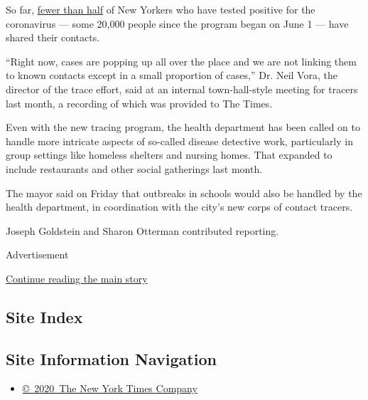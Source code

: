 So far,
\href{https://hhinternet.blob.core.windows.net/uploads/2020/07/test-and-trace-data-metrics-20200727.pdf}{fewer
than half} of New Yorkers who have tested positive for the coronavirus
--- some 20,000 people since the program began on June 1 --- have shared
their contacts.

``Right now, cases are popping up all over the place and we are not
linking them to known contacts except in a small proportion of cases,''
Dr. Neil Vora, the director of the trace effort, said at an internal
town-hall-style meeting for tracers last month, a recording of which was
provided to The Times.

Even with the new tracing program, the health department has been called
on to handle more intricate aspects of so-called disease detective work,
particularly in group settings like homeless shelters and nursing homes.
That expanded to include restaurants and other social gatherings last
month.

The mayor said on Friday that outbreaks in schools would also be handled
by the health department, in coordination with the city's new corps of
contact tracers.

Joseph Goldstein and Sharon Otterman contributed reporting.

Advertisement

\protect\hyperlink{after-bottom}{Continue reading the main story}

\hypertarget{site-index}{%
\subsection{Site Index}\label{site-index}}

\hypertarget{site-information-navigation}{%
\subsection{Site Information
Navigation}\label{site-information-navigation}}

\begin{itemize}
\tightlist
\item
  \href{https://help.nytimes.com/hc/en-us/articles/115014792127-Copyright-notice}{©~2020~The
  New York Times Company}
\end{itemize}

